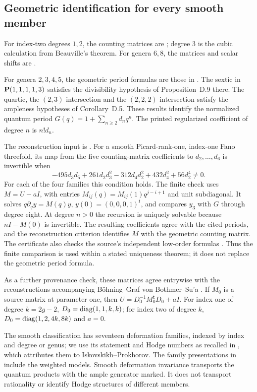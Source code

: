 \subsection{Geometric identification for every smooth member}
For index-two degrees $1,2$, the counting matrices are
\cite[Theorem~2.6.6]{Przyjalkowski}; degree $3$ is the cubic calculation
from Beauville's theorem. For genera $6,8$, the matrices and scalar shifts
are \cite[Theorem~6.1.1]{PrzyjalkowskiGenera}.

For genera $2,3,4,5$, the geometric period formulas are those in
\cite[Sections~8--11]{CCGK}. The sextic in $\mathbf P(1,1,1,1,3)$ satisfies
the divisibility hypothesis of Proposition~D.9 there. The quartic,
the $(2,3)$ intersection and the $(2,2,2)$ intersection satisfy the
ampleness hypotheses of Corollary~D.5. These results identify the
normalized quantum period $G(q)=1+\sum_{n\geq2}d_nq^n$.
The printed regularized coefficient of degree $n$ is $n!d_n$.

The reconstruction input is \cite[Proposition~6.2.2]{PrzyjalkowskiGenera}.
For a smooth Picard-rank-one, index-one Fano threefold, its map from the
five counting-matrix coefficients to $d_2,\ldots,d_6$ is invertible when
\[
 -495d_3d_5+261d_2d_3^2-312d_4d_2^2+432d_4^2+56d_2^4\ne0.
\]
For each of the four families this condition holds. The finite check uses
$M=U-aI$, with entries $M_{ij}(q)=M_{ij}(1)q^{j-i+1}$ and unit
subdiagonal. It solves $q\partial_q y=M(q)y$, $y(0)=(0,0,0,1)^t$,
and compares $y_3$ with $G$ through degree eight. At degree $n>0$ the
recursion is uniquely solvable because $nI-M(0)$ is invertible.
The resulting coefficients agree with the cited periods, and the
reconstruction criterion identifies $M$ with the geometric counting matrix.
The certificate also checks the source's independent low-order formulas
\cite[Example~5.4]{PrzyjalkowskiGenera}. Thus the finite comparison is used
within a stated uniqueness theorem; it does not replace the geometric
period formula.

As a further provenance check, these matrices agree entrywise with the
reconstructions accompanying B\"ohning--Graf von Bothmer--Su'a
\cite[Sections~9--10 and associated data]{NaiveAtoms}. If $M_0$ is a source
matrix at parameter one, then $U=D_0^{-1}M_0^{\mathsf t}D_0+aI$.
For index one of degree $k=2g-2$, $D_0=\operatorname{diag}(1,1,k,k)$; for index two
of degree $k$, $D_0=\operatorname{diag}(1,2,4k,8k)$ and $a=0$.

The smooth classification has seventeen deformation families, indexed by
index and degree or genus; we use its statement and Hodge numbers as recalled
in \cite[Introduction and Table~5]{KuznetsovProkhorovNodal}, which attributes
them to Iskovskikh--Prokhorov. The family presentations in
\cite[Sections~3--17]{CCGK} include the weighted models.
Smooth deformation invariance transports the quantum products with the ample
generator marked. It does not transport rationality or identify Hodge
structures of different members.

